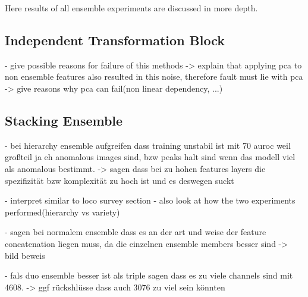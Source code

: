 Here results of all ensemble experiments are discussed in more depth. 

\subsection{Independent Transformation Block}
\label{subsec:ITBfaildiscussion}

- give possible reasons for failure of this methods\newline
-> explain that applying pca to non ensemble features also resulted in this noise, therefore fault must lie with pca\newline
-> give reasons why pca can fail(non linear dependency, ...)\newline


\subsection{Stacking Ensemble}
\label{subsec:stackingdiscussion}


- bei hierarchy ensemble aufgreifen dass training unstabil ist mit 70 auroc weil großteil ja eh anomalous images sind, bzw peaks halt sind wenn das modell viel als anomalous bestimmt.
-> sagen dass bei zu hohen features layers die spezifizität bzw komplexität zu hoch ist und es deswegen suckt

- interpret similar to loco survey section\newline
- also look at how the two experiments performed(hierarchy vs variety)\newline


- sagen bei normalem ensemble dass es an der art und weise der feature concatenation liegen muss, da die einzelnen ensemble members besser sind
-> bild beweis

- fals duo ensemble besser ist als triple sagen dass es zu viele channels sind mit 4608. -> ggf rückshlüsse dass auch 3076 zu viel sein könnten

